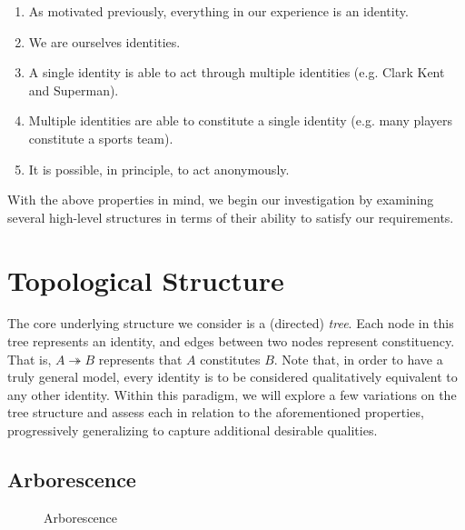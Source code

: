 \documentclass[pra,twocolumn,groupedaddress,10pt]{revtex4}
\theoremstyle{definition}
\begin{document}
\begin{enumerate}
	\item As motivated previously, everything in our experience is an identity.
	\item We are ourselves identities.
	\item A single identity is able to act through multiple identities (e.g. Clark Kent and Superman).
	\item Multiple identities are able to constitute a single identity (e.g. many players constitute a sports team).
	\item It is possible, in principle, to act anonymously.
\end{enumerate}

With the above properties in mind, we begin our investigation by examining several high-level structures in terms of their ability to satisfy our requirements.

\section{Topological Structure} \label{sec:topstr}

The core underlying structure we consider is a (directed) \textit{tree}. Each node in this tree represents an identity, and edges between two nodes represent constituency. That is, $A \twoheadrightarrow B$ represents that $A$ constitutes $B$. Note that, in order to have a truly general model, every identity is to be considered qualitatively equivalent to any other identity. Within this paradigm, we will explore a few variations on the tree structure and assess each in relation to the aforementioned properties, progressively generalizing to capture additional desirable qualities.

\subsection{Arborescence} \label{sec:arborescence}

\begin{figure}[htp]
\centering
{}
\caption{\label{fig:arborescence}Arborescence}
\end{figure}
\end{document}
